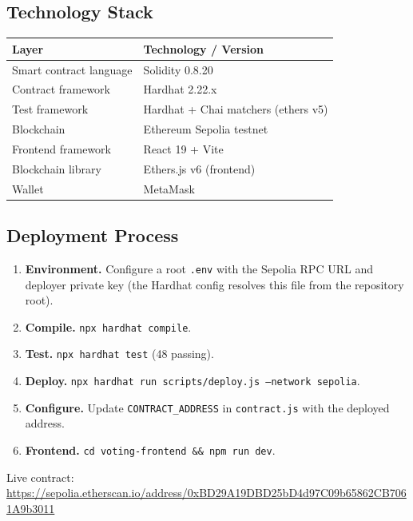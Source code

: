 \documentclass[11pt]{article}
\begin{document}
\subsection{Technology Stack}
\begin{center}
\begin{tabular}{@{}ll@{}}
\toprule
\textbf{Layer} & \textbf{Technology / Version} \\
\midrule
Smart contract language & Solidity 0.8.20 \\
Contract framework & Hardhat 2.22.x \\
Test framework & Hardhat + Chai matchers (ethers v5) \\
Blockchain & Ethereum Sepolia testnet \\
Frontend framework & React 19 + Vite \\
Blockchain library & Ethers.js v6 (frontend) \\
Wallet & MetaMask \\
\bottomrule
\end{tabular}
\end{center}

\subsection{Deployment Process}
\begin{enumerate}[nosep]
  \item \textbf{Environment.} Configure a root \texttt{.env} with the Sepolia RPC URL and deployer private key (the Hardhat config resolves this file from the repository root).
  \item \textbf{Compile.} \texttt{npx hardhat compile}.
  \item \textbf{Test.} \texttt{npx hardhat test} (48 passing).
  \item \textbf{Deploy.} \texttt{npx hardhat run scripts/deploy.js --network sepolia}.
  \item \textbf{Configure.} Update \texttt{CONTRACT\_ADDRESS} in \texttt{contract.js} with the deployed address.
  \item \textbf{Frontend.} \texttt{cd voting-frontend \&\& npm run dev}.
\end{enumerate}
Live contract:
\url{https://sepolia.etherscan.io/address/0xBD29A19DBD25bD4d97C09b65862CB7061A9b3011}

\end{document}
